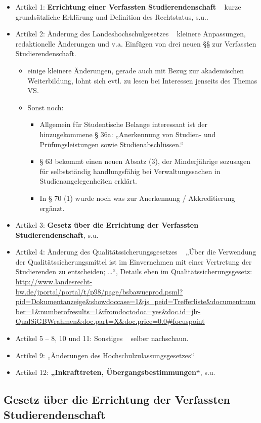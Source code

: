 \documentclass[
10pt,
a4paper,
twoside,								%
titlepage=false,							%
draft=false								%
]{scrartcl}
\begin{document}
\begin{itemize}
	\item Artikel 1: \textbf{Errichtung einer Verfassten Studierendenschaft} \textrightarrow~ kurze grundsätzliche Erklärung und Definition des Rechtstatus, s.u..
	\item Artikel 2: Änderung des Landeshochschulgesetzes \textrightarrow~ kleinere Anpassungen, redaktionelle Änderungen und v.a. Einfügen von drei neuen §§ zur Verfassten Studierendenschaft.
	\begin{itemize}
		\item einige kleinere Änderungen, gerade auch mit Bezug zur akademischen Weiterbildung, lohnt sich evtl. zu lesen bei Interessen jenseits des Themas VS.
		\item Sonst noch:
		\begin{itemize}
			\item Allgemein für Studentische Belange interessant ist der hinzugekommene § 36a: „Anerkennung von Studien- und Prüfungsleistungen sowie Studienabschlüssen.“
			\item § 63 bekommt einen neuen Absatz (3), der Minderjährige sozusagen für selbstständig handlungsfähig bei Verwaltungssachen in Studienangelegenheiten erklärt.
			\item In § 70 (1) wurde noch was zur Anerkennung / Akkreditierung ergänzt.
		\end{itemize}
	\end{itemize}
	\item Artikel 3: \textbf{Gesetz über die Errichtung der Verfassten Studierendenschaft}, s.u.
	\item Artikel 4: Änderung des Qualitätssicherungsgesetzes \textrightarrow~ „Über die Verwendung der Qualitätssicherungsmittel ist im Einvernehmen mit einer Vertretung der Studierenden zu entscheiden; …“, Details eben im Qualitätssicherungsgesetz:  \url{http://www.landesrecht-bw.de/jportal/portal/t/p98/page/bsbawueprod.psml?pid=Dokumentanzeige&showdoccase=1&js_peid=Trefferliste&documentnumber=1&numberofresults=1&fromdoctodoc=yes&doc.id=jlr-QualSiGBWrahmen&doc.part=X&doc.price=0.0#focuspoint}
	\item Artikel 5 – 8, 10 und 11: Sonstiges \textrightarrow~ selber nachschaun.
	\item Artikel 9: „Änderungen des Hochschulzulassungsgesetzes“
	\item Artikel 12: \textbf{„Inkrafttreten, Übergangsbestimmungen“}, s.u.
\end{itemize}

\subsection{Gesetz über die Errichtung der Verfassten Studierendenschaft}
\end{document}
